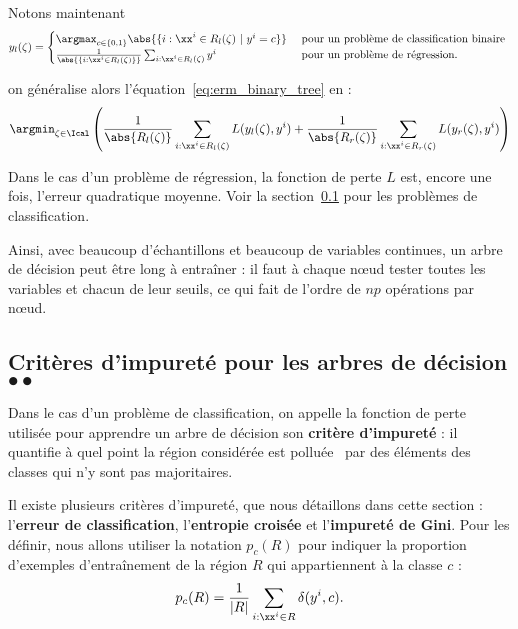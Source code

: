 Notons maintenant
\begin{equation*}
  y_l(\zeta) =
  \begin{cases}
    \argmax_{c \in \{0, 1\}} \abs{\{i:\xx^i \in R_l(\zeta) ~|~y^i=c\}} & \text{ pour un problème de classification binaire } \\
    \frac1{\abs{\{i:\xx^i \in R_l(\zeta)\}}} \sum_{i:\xx^i \in R_l(\zeta)} y^i & \text{ pour un problème de régression.}
  \end{cases}
\end{equation*}

on généralise alors l'équation~\eqref{eq:erm_binary_tree} en :
\begin{equation}
  \argmin_{\zeta \in \Ical} \left( 
    \frac1{\abs{R_l(\zeta)}} \sum_{i: \xx^i \in R_l(\zeta)} L(y_l(\zeta), y^i)  + 
     \frac1{\abs{R_r(\zeta)}} \sum_{i: \xx^i \in R_r(\zeta)} L(y_r(\zeta), y^i)
  \right)
\end{equation}

Dans le cas d'un problème de régression, la fonction de perte $L$ est, encore
une fois, l'erreur quadratique moyenne. Voir la section~\ref{sec:impurity} pour
les problèmes de classification.

Ainsi, avec beaucoup d'échantillons et beaucoup de variables continues, un
arbre de décision peut être long à entraîner : il faut à chaque n{\oe}ud tester
toutes les variables et chacun de leur seuils, ce qui fait de l'ordre de $np$
opérations par n{\oe}ud.

\subsection{Critères d'impureté pour les arbres de décision $\bullet \bullet$}
\label{sec:impurity}
Dans le cas d'un problème de classification, on appelle la fonction de perte
utilisée pour apprendre un arbre de décision son \textbf{critère d'impureté} :
il quantifie à quel point la région considérée est \og polluée \fg~par des
éléments des classes qui n'y sont pas
majoritaires.

Il existe plusieurs critères d'impureté, que nous détaillons dans cette section
: l'\textbf{erreur de classification}, l'\textbf{entropie croisée} et
l'\textbf{impureté de Gini}. Pour les définir, nous allons utiliser la notation
$p_c(R)$ pour indiquer la proportion d'exemples d'entraînement de la région $R$
qui appartiennent à la classe $c$ :
\begin{equation*}
  p_c(R) = \frac1{\lvert R \rvert} \sum_{i : \xx^i \in R} \delta(y^i, c).       
\end{equation*}

